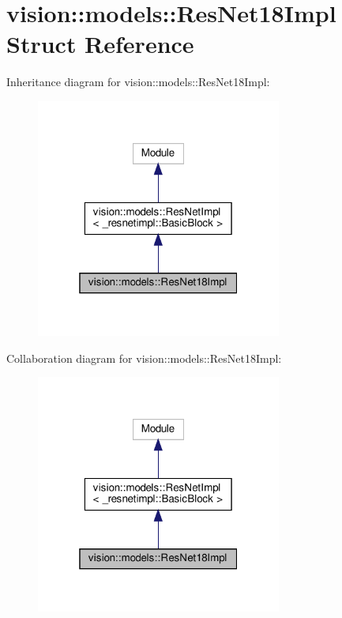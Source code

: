 \hypertarget{structvision_1_1models_1_1ResNet18Impl}{}\section{vision\+:\+:models\+:\+:Res\+Net18\+Impl Struct Reference}
\label{structvision_1_1models_1_1ResNet18Impl}


Inheritance diagram for vision\+:\+:models\+:\+:Res\+Net18\+Impl\+:
\nopagebreak
\begin{figure}[H]
\begin{center}
\leavevmode
\includegraphics[width=229pt]{structvision_1_1models_1_1ResNet18Impl__inherit__graph}
\end{center}
\end{figure}


Collaboration diagram for vision\+:\+:models\+:\+:Res\+Net18\+Impl\+:
\nopagebreak
\begin{figure}[H]
\begin{center}
\leavevmode
\includegraphics[width=229pt]{structvision_1_1models_1_1ResNet18Impl__coll__graph}
\end{center}
\end{figure}
